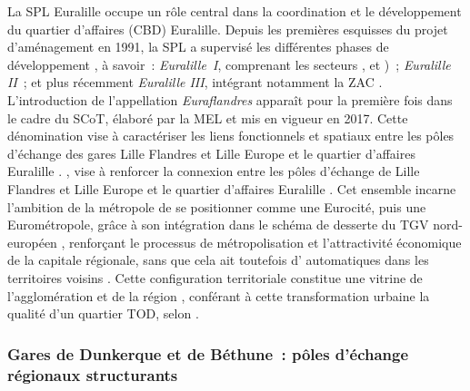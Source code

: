 \begin{refsegment}
{    La \acrshort{SPL} Euralille occupe un rôle central dans la coordination et le développement du quartier d’affaires (\acrshort{CBD}) Euralille. Depuis les premières esquisses du projet d’aménagement en 1991, la \acrshort{SPL} a supervisé les différentes phases de développement \textcolor{blue}{\autocite[]{hayer_fabriquer_2005}}, à savoir~: \textsl{Euralille~I}, comprenant les secteurs ,  et )~; \textsl{Euralille II}~; et plus récemment \textsl{Euralille III}, intégrant notamment la \acrfull{ZAC} . L’introduction de l’appellation \textsl{Euraflandres} apparaît pour la première fois dans le cadre du \acrshort{SCoT}, élaboré par la \acrfull{MEL} et mis en vigueur en 2017. Cette dénomination vise à caractériser les liens fonctionnels et spatiaux entre les pôles d’échange des gares Lille Flandres et Lille Europe et le quartier d’affaires Euralille \textcolor{blue}{\autocite[71]{adulm_rapport_2017}}.
}, vise à renforcer la connexion entre les pôles d'échange de Lille Flandres et Lille Europe et le quartier d'affaires Euralille \textcolor{blue}{\autocite[71]{adulm_rapport_2017}}. Cet ensemble incarne l’ambition de la métropole de se positionner comme une Eurocité, puis une Eurométropole, grâce à son intégration dans le schéma de desserte du \acrshort{TGV} nord-européen \textcolor{blue}{\autocite[155]{baron_reseaux_2017}}, renforçant le processus de métropolisation et l'attractivité économique de la capitale régionale, sans que cela ait toutefois d' automatiques \textcolor{blue}{\autocite[238]{offner__1993}} dans les territoires voisins \textcolor{blue}{\autocite[109]{chen_wider_2012}}. Cette configuration territoriale  constitue une vitrine de l'agglomération et de la région \textcolor{blue}{\autocite[2]{heddebaut_city-hubs_2018}}, conférant à cette transformation urbaine la qualité d'un quartier \acrshort{TOD}, selon \textcolor{blue}{\textcite[5]{heddebaut_city-hubs_2018}}.%

\subsubsection*{Gares de Dunkerque et de Béthune~: pôles d'échange régionaux structurants
    \label{chap3:application-observation-quantitative-dunkerque-bethune}
    }


\end{refsegment}
